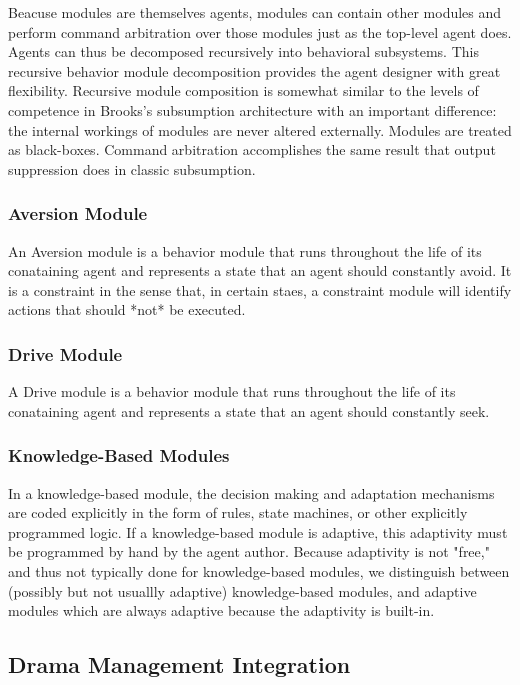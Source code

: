 Beacuse modules are themselves agents, modules can contain other
modules and perform command arbitration over those modules just as the
top-level agent does.  Agents can thus be decomposed recursively into
behavioral subsystems.  This recursive behavior module decomposition
provides the agent designer with great flexibility.  Recursive module
composition is somewhat similar to the levels of competence in
Brooks's subsumption architecture with an important difference: the
internal workings of modules are never altered externally.  Modules
are treated as black-boxes.  Command arbitration accomplishes the same
result that output suppression does in classic subsumption.


\subsubsection{Aversion Module}

An Aversion module is a behavior module that runs throughout the life
of its conataining agent and represents a state that an agent should
constantly avoid.  It is a constraint in the sense that, in certain
staes, a constraint module will identify actions that should *not* be
executed.


\subsubsection{Drive Module}

A Drive module is a behavior module that runs throughout the life of
its conataining agent and represents a state that an agent should
constantly seek.

\subsubsection{Knowledge-Based Modules}

In a knowledge-based module, the decision making and adaptation
mechanisms are coded explicitly in the form of rules, state machines,
or other explicitly programmed logic.  If a knowledge-based module is
adaptive, this adaptivity must be programmed by hand by the agent
author.  Because adaptivity is not "free," and thus not typically done
for knowledge-based modules, we distinguish between (possibly but not
usuallly adaptive) knowledge-based modules, and adaptive modules which
are always adaptive because the adaptivity is built-in.

\subsection{Drama Management Integration}

